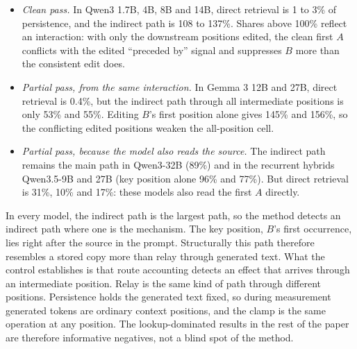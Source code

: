 \documentclass[
]{article}
\providecommand{\tightlist}{%
  \setlength{\itemsep}{0pt}\setlength{\parskip}{0pt}}
\begin{document}
\begin{itemize}
\tightlist
\item
  \emph{Clean pass.} In Qwen3 1.7B, 4B, 8B and 14B, direct retrieval is
  1 to 3\% of persistence, and the indirect path is 108 to 137\%. Shares
  above 100\% reflect an interaction: with only the downstream positions
  edited, the clean first \(A\) conflicts with the edited ``preceded
  by'' signal and suppresses \(B\) more than the consistent edit does.
\item
  \emph{Partial pass, from the same interaction.} In Gemma 3 12B and
  27B, direct retrieval is 0.4\%, but the indirect path through all
  intermediate positions is only 53\% and 55\%. Editing \(B\)'s first
  position alone gives 145\% and 156\%, so the conflicting edited
  positions weaken the all-position cell.
\item
  \emph{Partial pass, because the model also reads the source.} The
  indirect path remains the main path in Qwen3-32B (89\%) and in the
  recurrent hybrids Qwen3.5-9B and 27B (key position alone 96\% and
  77\%). But direct retrieval is 31\%, 10\% and 17\%: these models also
  read the first \(A\) directly.
\end{itemize}

In every model, the indirect path is the largest path, so the method
detects an indirect path where one is the mechanism. The key position,
\(B\)'s first occurrence, lies right after the source in the prompt.
Structurally this path therefore resembles a stored copy more than relay
through generated text. What the control establishes is that route
accounting detects an effect that arrives through an intermediate
position. Relay is the same kind of path through different positions.
Persistence holds the generated text fixed, so during measurement
generated tokens are ordinary context positions, and the clamp is the
same operation at any position. The lookup-dominated results in the rest
of the paper are therefore informative negatives, not a blind spot of
the method.
\end{document}
